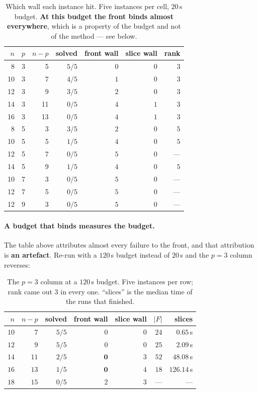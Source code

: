 \documentclass[11pt,a4paper]{article}
\begin{document}
\begin{table}[h]
\centering
\caption{Which wall each instance hit.  Five instances per cell, $20$\,s
budget.  \textbf{At this budget the front binds almost everywhere}, which is a
property of the budget and not of the method --- see below.}
\label{tab:walls}
\small
\begin{tabular}{rrrrrrr}
\toprule
$n$ & $p$ & $n-p$ & solved & front wall & slice wall & rank \\
\midrule
 8 & 3 &  5 & $5/5$ & $0$ & $0$ & $3$ \\
10 & 3 &  7 & $4/5$ & $1$ & $0$ & $3$ \\
12 & 3 &  9 & $3/5$ & $2$ & $0$ & $3$ \\
14 & 3 & 11 & $0/5$ & $4$ & $1$ & $3$ \\
16 & 3 & 13 & $0/5$ & $4$ & $1$ & $3$ \\
\midrule
 8 & 5 &  3 & $3/5$ & $2$ & $0$ & $5$ \\
10 & 5 &  5 & $1/5$ & $4$ & $0$ & $5$ \\
12 & 5 &  7 & $0/5$ & $5$ & $0$ & --- \\
14 & 5 &  9 & $1/5$ & $4$ & $0$ & $5$ \\
\midrule
10 & 7 &  3 & $0/5$ & $5$ & $0$ & --- \\
12 & 7 &  5 & $0/5$ & $5$ & $0$ & --- \\
12 & 9 &  3 & $0/5$ & $5$ & $0$ & --- \\
\bottomrule
\end{tabular}
\end{table}

\paragraph{A budget that binds measures the budget.}
The table above attributes almost every failure to the front, and that
attribution is \textbf{an artefact}.  Re-run with a $120$\,s budget instead of
$20$\,s and the $p=3$ column reverses:

\begin{table}[h]
\centering
\caption{The $p=3$ column at a $120$\,s budget.  Five instances per row; rank
came out $3$ in every one.  ``slices'' is the median time of the runs that
finished.}
\label{tab:walls120}
\begin{tabular}{rrrrrrr}
\toprule
$n$ & $n-p$ & solved & front wall & slice wall & $|F|$ & slices \\
\midrule
$10$ & $7$ & $5/5$ & $0$ & $0$ & $24$ & $0.65$\,s \\
$12$ & $9$ & $5/5$ & $0$ & $0$ & $25$ & $2.09$\,s \\
$14$ & $11$ & $2/5$ & $\mathbf{0}$ & $3$ & $52$ & $48.08$\,s \\
$16$ & $13$ & $1/5$ & $\mathbf{0}$ & $4$ & $18$ & $126.14$\,s \\
$18$ & $15$ & $0/5$ & $2$ & $3$ & --- & --- \\
\bottomrule
\end{tabular}
\end{table}
\end{document}
